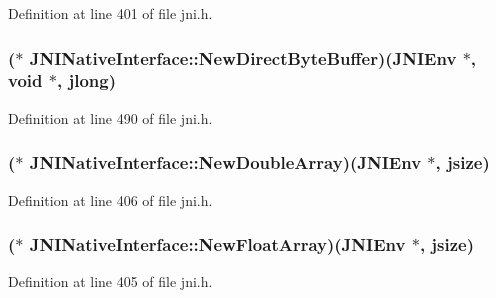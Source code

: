 Definition at line 401 of file jni.\-h.

\hypertarget{struct_j_n_i_native_interface_ae21c986528958bd66721995a59f7e7a5}{
\subsubsection[{New\-Direct\-Byte\-Buffer}]{($\ast$ J\-N\-I\-Native\-Interface\-::\-New\-Direct\-Byte\-Buffer)({\bf J\-N\-I\-Env} $\ast$, void $\ast$, {\bf jlong})}}\label{struct_j_n_i_native_interface_ae21c986528958bd66721995a59f7e7a5}


Definition at line 490 of file jni.\-h.

\hypertarget{struct_j_n_i_native_interface_a8e6024a2ef2f1f456297f9644ba17c3f}{
\subsubsection[{New\-Double\-Array}]{($\ast$ J\-N\-I\-Native\-Interface\-::\-New\-Double\-Array)({\bf J\-N\-I\-Env} $\ast$, {\bf jsize})}}\label{struct_j_n_i_native_interface_a8e6024a2ef2f1f456297f9644ba17c3f}


Definition at line 406 of file jni.\-h.

\hypertarget{struct_j_n_i_native_interface_aed04469d19afedb5df07142c2bb2f647}{
\subsubsection[{New\-Float\-Array}]{($\ast$ J\-N\-I\-Native\-Interface\-::\-New\-Float\-Array)({\bf J\-N\-I\-Env} $\ast$, {\bf jsize})}}\label{struct_j_n_i_native_interface_aed04469d19afedb5df07142c2bb2f647}


Definition at line 405 of file jni.\-h.

